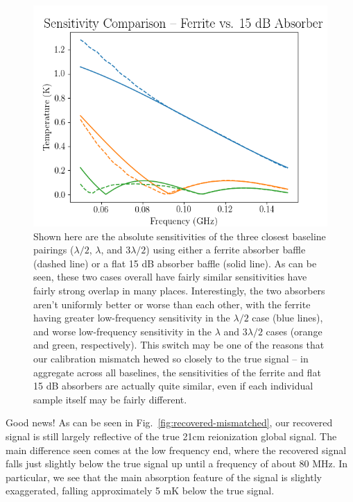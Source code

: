 \begin{figure}
    \begin{center}
    \includegraphics[width=\linewidth]{sensitivity_comparison.png}
    \end{center}
    \caption{
        Shown here are the absolute sensitivities of the three closest baseline 
        pairings ($\lambda/2$, $\lambda$, and $3\lambda/2$) using either a 
        ferrite absorber baffle (dashed line) or a flat 15 dB absorber baffle 
        (solid line). As can be seen, these two cases overall have fairly 
        similar sensitivities have fairly strong overlap in many places.  
        Interestingly, the two absorbers aren't uniformly better or worse than 
        each other, with the ferrite having greater low-frequency sensitivity 
        in the $\lambda/2$ case (blue lines), and worse low-frequency 
        sensitivity in the $\lambda$ and $3\lambda/2$ cases (orange and green, 
        respectively). This switch may be one of the reasons that our 
        calibration mismatch hewed so closely to the true signal -- in 
        aggregate across all baselines, the sensitivities of the ferrite and 
        flat 15 dB absorbers are actually quite similar, even if each 
        individual sample itself may be fairly different.
    }
    \label{fig:sensitivity-comparison}
\end{figure}

Good news! As can be seen in Fig.~\ref{fig:recovered-mismatched}, our recovered 
signal is still largely reflective of the true 21cm reionization global signal.  
The main difference seen comes at the low frequency end, where the recovered 
signal falls just slightly below the true signal up until a frequency of about 
80 MHz. In particular, we see that the main absorption feature of the signal is 
   slightly exaggerated, falling approximately 5 mK below the true signal.

